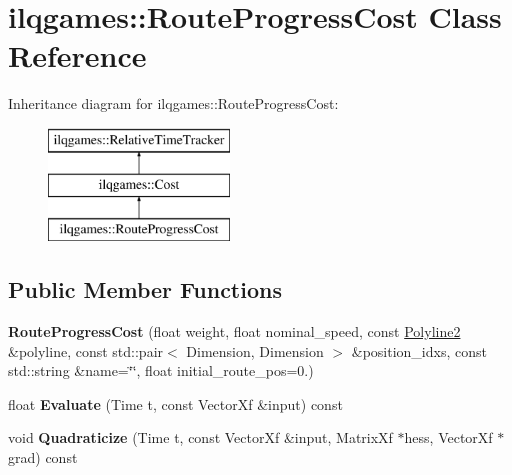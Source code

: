 \hypertarget{classilqgames_1_1_route_progress_cost}{}\section{ilqgames\+:\+:Route\+Progress\+Cost Class Reference}
\label{classilqgames_1_1_route_progress_cost}
Inheritance diagram for ilqgames\+:\+:Route\+Progress\+Cost\+:\begin{figure}[H]
\begin{center}
\leavevmode
\includegraphics[height=3.000000cm]{classilqgames_1_1_route_progress_cost}
\end{center}
\end{figure}
\subsection*{Public Member Functions}
\begin{DoxyCompactItemize}
\item 
{\bfseries Route\+Progress\+Cost} (float weight, float nominal\+\_\+speed, const \hyperlink{classilqgames_1_1_polyline2}{Polyline2} \&polyline, const std\+::pair$<$ Dimension, Dimension $>$ \&position\+\_\+idxs, const std\+::string \&name=\char`\"{}\char`\"{}, float initial\+\_\+route\+\_\+pos=0.)\hypertarget{classilqgames_1_1_route_progress_cost_a9bc119604ce84627367f7e943e28a90d}{}\label{classilqgames_1_1_route_progress_cost_a9bc119604ce84627367f7e943e28a90d}

\item 
float {\bfseries Evaluate} (Time t, const Vector\+Xf \&input) const \hypertarget{classilqgames_1_1_route_progress_cost_a93a76046fac60030e3f8767c0b8efea0}{}\label{classilqgames_1_1_route_progress_cost_a93a76046fac60030e3f8767c0b8efea0}

\item 
void {\bfseries Quadraticize} (Time t, const Vector\+Xf \&input, Matrix\+Xf $\ast$hess, Vector\+Xf $\ast$grad) const \hypertarget{classilqgames_1_1_route_progress_cost_a51ac030f155eafcf5c7f52ee7220ec4f}{}\label{classilqgames_1_1_route_progress_cost_a51ac030f155eafcf5c7f52ee7220ec4f}

\end{DoxyCompactItemize}
